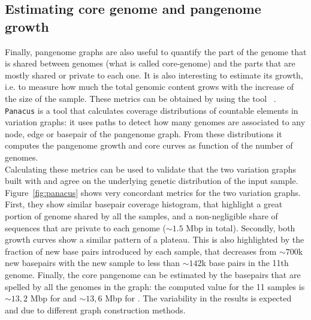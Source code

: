 \subsection{Estimating core genome and pangenome growth}
\label{sec:core_pg}
Finally, pangenome graphs are also useful to quantify the part of the genome that is shared between genomes (what is called core-genome) and the parts that are mostly shared or private to each one. It is also interesting to estimate its growth, i.e. to measure how much the total genomic content grows with the increase of the size of the sample. These metrics can be obtained by using the tool \panacus~\cite{panacus}. \texttt{Panacus} is a tool that calculates coverage distributions of countable elements in variation graphs: it uses paths to detect how many genomes are associated to any node, edge or basepair of the pangenome graph. From these distributions it computes the pangenome growth and core curves as function of the number of genomes.\\
Calculating these metrics can be used to validate that the two variation graphs built with \pggb and \mcactus agree on the underlying genetic distribution of the input sample.\\
Figure~\ref{fig:panacus} shows very concordant metrics for the two variation graphs. First, they show similar basepair coverage histogram, that highlight a great portion of genome shared by all the samples, and a non-negligible share of sequences that are private to each genome ($\sim1.5$ Mbp in total). Secondly, both growth curves show a similar pattern of a plateau. This is also highlighted by the fraction of new base pairs introduced by each sample, that decreases from $\sim700$k new basepairs with the new sample to less than $\sim142$k base pairs in the 11th genome. Finally, the core pangenome can be estimated by the basepairs that are spelled by all the genomes in the graph: the computed value for the 11 samples is $\sim13,2$ Mbp for \pggb and $\sim13,6$ Mbp for \mcactus. The variability in the results is expected and due to different graph construction methods.

